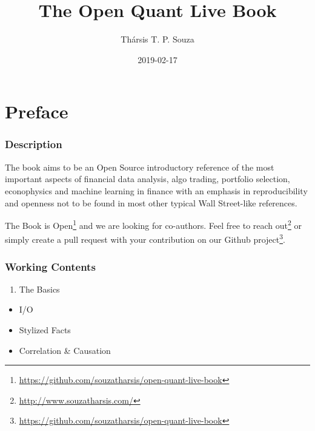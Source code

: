 \documentclass[]{book}
\title{The Open Quant Live Book}
\author{Thársis T. P. Souza}
\date{2019-02-17}
\DeclareRobustCommand{\href}[2]{#2\footnote{\url{#1}}}
\providecommand{\tightlist}{%
  \setlength{\itemsep}{0pt}\setlength{\parskip}{0pt}}
\theoremstyle{definition}
\theoremstyle{definition}
\theoremstyle{definition}
\theoremstyle{remark}
\begin{document}


\maketitle

{
\hypersetup{linkcolor=}
\setcounter{tocdepth}{2}
\tableofcontents
}
\newcommand{\independent}{\perp\!\!\!\!\perp}

\DeclarePairedDelimiter\ceil{\lceil}{\rceil}
\DeclarePairedDelimiter\floor{\lfloor}{\rfloor}

\chapter*{Preface}\label{preface}


\subsection*{Description}\label{description}


The book aims to be an Open Source introductory reference of the most
important aspects of financial data analysis, algo trading, portfolio
selection, econophysics and machine learning in finance with an emphasis
in reproducibility and openness not to be found in most other typical
Wall Street-like references.

The Book is
\href{https://github.com/souzatharsis/open-quant-live-book}{Open} and we
are looking for co-authors. Feel free to
\href{http://www.souzatharsis.com/}{reach out} or simply create a pull
request with your contribution on our
\href{https://github.com/souzatharsis/open-quant-live-book}{Github
project}.

\subsection*{Working Contents}\label{working-contents}


\begin{enumerate}
\def\labelenumi{\arabic{enumi}.}
\tightlist
\item
  The Basics
\end{enumerate}

\begin{itemize}
\tightlist
\item
  I/O
\item
  Stylized Facts
\item
  Correlation \& Causation
\end{itemize}
\end{document}
